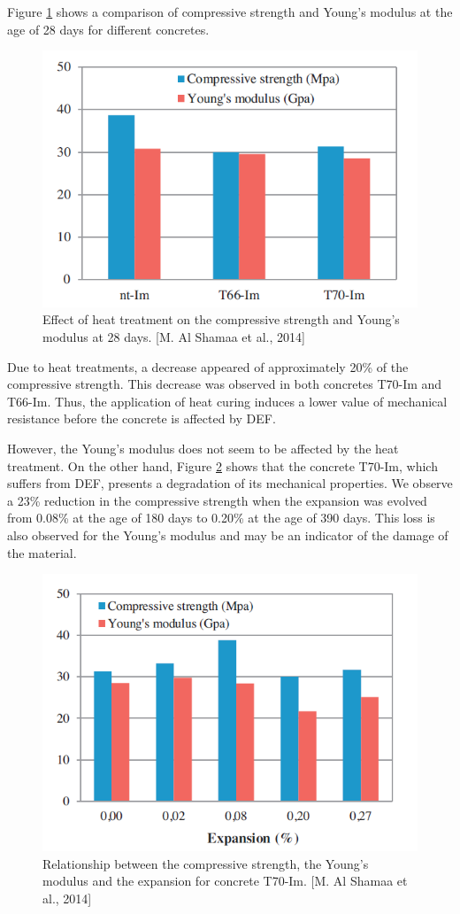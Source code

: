 Figure \ref{Shamaa_2} shows a comparison of compressive strength and Young’s modulus at the age of 28 days for different concretes.

\begin{figure}[h!]
  \centering
  \includegraphics[width=0.8\linewidth]{Reference/Shamaa2.png}
  \caption{Effect of heat treatment on the compressive strength and Young’s modulus
at 28 days. [M. Al Shamaa et al., 2014\cite{Shamaa}]}
  \label{Shamaa_2}
\end{figure}

Due to heat treatments, a decrease appeared of approximately 20\% of the compressive strength. This decrease was observed in both concretes T70-Im and T66-Im. Thus, the application of heat curing induces a lower value of mechanical resistance before the concrete is affected by DEF.

However, the Young’s modulus does not seem to be affected by the heat treatment. On the other hand, Figure \ref{Shamaa_3} shows that the concrete T70-Im, which suffers from DEF, presents a degradation of its mechanical properties. We observe a 23\% reduction in the compressive strength when the expansion was evolved from 0.08\% at the age of 180 days to 0.20\% at the age of 390 days. This loss is also observed for the Young’s modulus and may be an indicator of the damage of the material.

\begin{figure}[h!]
  \centering
  \includegraphics[width=0.8\linewidth]{Reference/Shamaa3.png}
  \caption{Relationship between the compressive strength, the Young’s modulus and
the expansion for concrete T70-Im. [M. Al Shamaa et al., 2014\cite{Shamaa}]}
  \label{Shamaa_3}
\end{figure}

